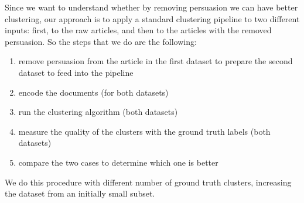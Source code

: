 Since we want to understand whether by removing persuasion we can have better clustering, our approach is to apply a standard clustering pipeline to two different inputs: first, to the raw articles, and then to the articles with the removed persuasion. So the steps that we do are the following: %
\begin{enumerate}
    \item remove persuasion from the article in the first dataset to prepare the second dataset to feed into the pipeline
    \item encode the documents (for both datasets)
    \item run the clustering algorithm (both datasets)
    \item measure the quality of the clusters with the ground truth labels (both datasets)
    \item compare the two cases to determine which one is better
\end{enumerate}

We do this procedure with different number of ground truth clusters, increasing the dataset from an initially small subset.%



